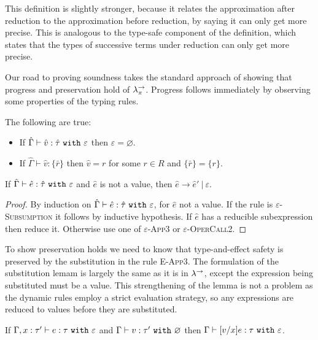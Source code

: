 This definition is slightly stronger, because it relates the approximation after reduction to the approximation before reduction, by saying it can only get more precise. This is analogous to the type-safe component of the definition, which states that the types of successive terms under reduction can only get more precise.

Our road to proving soundness takes the standard approach of showing that progress and preservation hold of $\lambda^{\rightarrow}_{\pi}$. Progress follows immediately by observing some properties of the typing rules.

\begin{lemma}
The following are true:
\begin{itemize}
	\setlength\itemsep{-0.7em}
	\item If $\hat \Gamma \vdash \hat v: \hat \tau~\mathtt{with}~ \varepsilon$ then $\varepsilon = \varnothing$.
	\item If $\hat \Gamma \vdash \hat v: \{ \bar r \}$ then $\hat v = r$ for some $r \in R$ and $\{ \bar r \} = \{ r \}$.
\end{itemize}
\end{lemma}

\begin{theorem}[Progress]
If $\hat \Gamma \vdash \hat e: \hat \tau~\mathtt{with}~ \varepsilon$ and $\hat e$ is not a value, then $\hat e \longrightarrow \hat e'~|~\varepsilon$.
\end{theorem}

\begin{proof} By induction on $\hat \Gamma \vdash \hat e: \hat \tau~\mathtt{with}~ \varepsilon$, for $\hat e$ not a value. If the rule is \textsc{$\varepsilon$-Subsumption} it follows by inductive hypothesis. If $\hat e$ has a reducible subexpression then reduce it. Otherwise use one of \textsc{$\varepsilon$-App3} or \textsc{$\varepsilon$-OperCall2}.
\end{proof}

To show preservation holds we need to know that type-and-effect safety is preserved by the substitution in the rule \textsc{E-App3}. The formulation of the substitution lemam is largely the same as it is in $\lambda^{\rightarrow}$, except the expression being substituted must be a value. This strengthening of the lemma is not a problem as the dynamic rules employ a strict evaluation strategy, so any expressions are reduced to values before they are substituted.

\begin{lemma}[Substitution]
If $\Gamma, x: \tau' \vdash e: \tau~\mathtt{with}~ \varepsilon$ and $\Gamma \vdash v: \tau'~\mathtt{with}~ \varnothing$ then $\Gamma \vdash [v/x]e: \tau~\mathtt{with}~ \varepsilon$.
\end{lemma}

